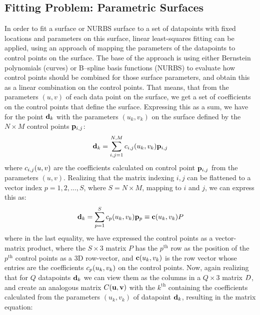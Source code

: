 \subsection{Fitting Problem: Parametric Surfaces}
In order to fit a \Bez surface or NURBS surface to a set of datapoints with fixed locations and parameters on this surface, linear least-squares fitting can be applied, using an approach of mapping the parameters of the datapoints to control points on the surface. The base of the approach is using either Bernstein polynomials (\Bez curves) or B--spline basis functions (NURBS) to evaluate how control points should be combined for those surface parameters, and obtain this as a linear combination on the control points. That means, that from the parameters $(u,v)$ of each data point on the surface, we get a set of coefficients on the control points that define the surface. Expressing this as a sum, we have for the point $\lsDataPointi{k}$ with the parameters $(u_k,v_k)$ on the surface defined by the $N \times M$ control points $\lsControlPointi{i,j}$:
\begin{equation}
\lsDataPointi{k} = \sum\limits_{i,j=1}^{N,M} \lsControlPointCoefi{i,j}(u_k,v_k) \lsControlPointi{i,j}
\end{equation} 
where $\lsControlPointCoefi{i,j}(u,v)$ are the coefficients calculated on control point $\lsControlPointi{i,j}$ from the parameters $(u,v)$. Realizing that the matrix indexing $i,j$ can be flattened to a vector index $p = 1,2,...,S$, where $S=N\times M$, mapping to $i$ and $j$, we can express this as:
\begin{equation}
\lsDataPointi{k} = \sum\limits_{p=1}^{S} \lsControlPointCoefi{p}(u_k,v_k) \lsControlPointi{p} \equiv \vec{\lsControlPointCoef}(u_k,v_k)\lsControlPointMatrix
\label{eqn:lsmatrix1}
\end{equation} 
where in the last equality, we have expressed the control points as a vector-matrix product, where the $S\times 3$ matrix $P$ has the $p^\text{th}$ row as the position of the $p^\text{th}$ control points as a 3D row-vector, and $\vec{\lsControlPointCoef}(u_k,v_k)$ is the row vector whose entries are the coefficients $\lsControlPointCoefi{p}(u_k,v_k)$ on the control points. Now, again realizing that for $Q$ datapoints $\lsDataPointi{k}$ we can view them as the columns in a $Q\times 3$ matrix $\lsDataPointMatrix$, and create an analogous matrix $\lsControlPointCoefMatrix(\vec{u},\vec{v})$ with the $k^\text{th}$ containing the coefficients calculated from the parameters $(u_k,v_k)$ of datapoint $\lsDataPointi{k}$, resulting in the matrix equation:

